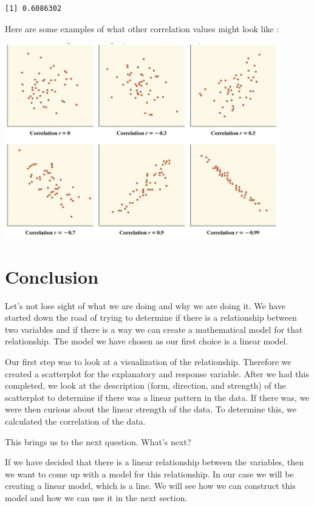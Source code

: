 \documentclass[
  letterpaper,
  DIV=11,
  numbers=noendperiod]{scrreprt}
\begin{document}
\begin{verbatim}
[1] 0.6086302
\end{verbatim}

Here are some examples of what other correlation values might look like
:

\includegraphics[width=0.9\textwidth,height=\textheight]{./images/SC_8.jpg}

\section*{Conclusion}\label{conclusion-4}


Let's not lose sight of what we are doing and why we are doing it. We
have started down the road of trying to determine if there is a
relationship between two variables and if there is a way we can create a
mathematical model for that relationship. The model we have chosen as
our first choice is a linear model.

Our first step was to look at a visualization of the relationship.
Therefore we created a scatterplot for the explanatory and response
variable. After we had this completed, we look at the description (form,
direction, and strength) of the scatterplot to determine if there was a
linear pattern in the data. If there was, we were then curious about the
linear strength of the data. To determine this, we calculated the
correlation of the data.

This brings us to the next question. What's next?

If we have decided that there is a linear relationship between the
variables, then we want to come up with a model for this relationship.
In our case we will be creating a linear model, which is a line. We will
see how we can construct this model and how we can use it in the next
section.
\end{document}
